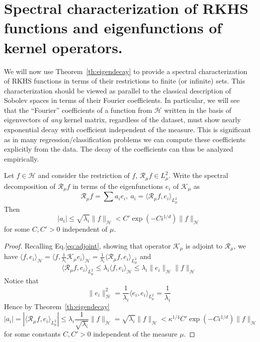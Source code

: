 \documentclass[final,12pt]{colt2018}
\renewcommand{\H}{\mathcal{H}}
\newcommand{\K}{\mathcal{K_\mu}}
\newcommand{\I}{\mathcal{R_{\mu}}}
\newcommand{\LL}{{L^2_\mu}}
\begin{document}
\section{\bf Spectral characterization of RKHS functions and eigenfunctions of kernel operators.}\label{sec:eigenvectors}
\vskip-5pt
We will now use Theorem~\ref{th:eigendecay}  to provide a spectral characterization
 of RKHS functions in terms of their restrictions to finite (or infinite) sets. This characterization should be viewed as parallel to the classical description of Sobolev spaces in terms of their Fourier coefficients.
In particular, we will see that the ``Fourier'' coefficients of a function from $\H$ written in the basis of eigenvectors of  {\it any} kernel matrix, regardless of the dataset, must show nearly exponential decay with coefficient independent of the measure.   
This is significant as in many regression/classification problems we can compute these coefficients explicitly from the data. The decay of the coefficients can thus be analyzed empirically.  


\begin{theorem}\label{thm:coeff}
Let $f\in \H$ and consider  the restriction of $f$, $\I f \in \LL$. Write the spectral decomposition of $\I f$ in terms of the eigenfunctions $e_i$ of $\K$ as 
$$
\I f = \sum a_i e_i, ~a_i=\langle \I f, e_i\rangle_\LL
$$
Then 
$$
|a_i| \le \sqrt{\lambda_i}\|f\|_\H < %
C'\exp{(-C i^{1/d})} \|f\|_\H
$$
for some $C, C'>0$ independent of $\mu$.
\end{theorem}
\begin{proof}
Recalling Eq.\ref{eq:adjoint}, showing that operator $\K$ is adjoint to $\I$, we have  
$
\langle f,  e_i \rangle_\H=\langle f, \frac{1}{\lambda_i} \K e_i \rangle_\H = \frac{1}{\lambda_i} \langle \I f, e_i\rangle_\LL
$ and 
$$ 
\langle \I f, e_i\rangle_\LL \le \lambda_i  \langle f,  e_i \rangle_\H \le \lambda_i \|e_i\|_\H \|f\|_\H
$$
Notice that 
$$
\|e_i\|_\H^2 = \frac{1}{\lambda_i} \langle e_i, e_i\rangle_\LL = \frac{1}{\lambda_i}
$$
Hence by Theorem~\ref{th:eigendecay}
$$
|a_i|=| \langle \I f, e_i\rangle_\LL|  \le \lambda_i \frac{1}{\sqrt{\lambda_i}} \|f\|_\H = \sqrt{\lambda_i}\|f\|_\H  < {\kappa^{1/4} C'\exp(-C i^{1/d})} \|f\|_\H
$$
for some constants $C,C'>0$  independent of the measure $\mu$.  
\end{proof}
\end{document}

